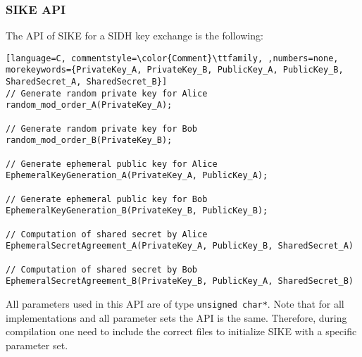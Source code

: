 \subsubsection{SIKE API}
The API of SIKE for a SIDH key exchange is the following:


\begin{lstlisting}[language=C, commentstyle=\color{Comment}\ttfamily, ,numbers=none, morekeywords={PrivateKey_A, PrivateKey_B, PublicKey_A, PublicKey_B, SharedSecret_A, SharedSecret_B}]
// Generate random private key for Alice
random_mod_order_A(PrivateKey_A);

// Generate random private key for Bob
random_mod_order_B(PrivateKey_B);

// Generate ephemeral public key for Alice
EphemeralKeyGeneration_A(PrivateKey_A, PublicKey_A);

// Generate ephemeral public key for Bob
EphemeralKeyGeneration_B(PrivateKey_B, PublicKey_B);

// Computation of shared secret by Alice
EphemeralSecretAgreement_A(PrivateKey_A, PublicKey_B, SharedSecret_A)

// Computation of shared secret by Bob
EphemeralSecretAgreement_B(PrivateKey_B, PublicKey_A, SharedSecret_B)

\end{lstlisting}
All parameters used in this API are of type \texttt{unsigned char*}. Note that for all implementations and all parameter sets the API is the same. Therefore, during compilation one need to include the correct files to initialize SIKE with a specific parameter set.

